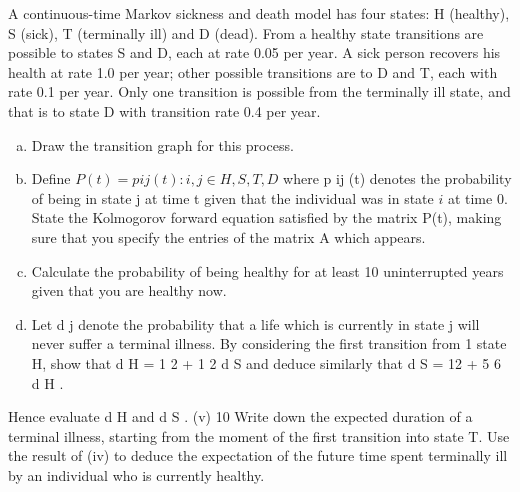 \documentclass[a4paper,12pt]{article}
\begin{document}
A continuous-time Markov sickness and death model has four states: H (healthy),
S (sick), T (terminally ill) and D (dead). From a healthy state transitions are possible to states S and D, each at rate 0.05 per year. A sick person recovers his health at rate 1.0 per year; other possible transitions are to D and T, each with
rate 0.1 per year. Only one transition is possible from the terminally ill state, and that is to state D with transition rate 0.4 per year.
\begin{enumerate}[(a)]
\item Draw the transition graph for this process.
\item Define $P(t) = {p ij (t) : i, j \in H, S, T, D}$ where p ij (t) denotes the probability of being in state j at time t given that the individual was in state $i$ at time 0.
State the Kolmogorov forward equation satisfied by the matrix P(t), making sure that you specify the entries of the matrix A which appears.

\item Calculate the probability of being healthy for at least 10 uninterrupted years given that you are healthy now.

\item Let d j denote the probability that a life which is currently in state j will never suffer a terminal illness. By considering the first transition from
1
state H, show that d H = 1 2 + 1 2 d S and deduce similarly that d S = 12
+ 5 6 d H .
\end{enumerate}

Hence evaluate d H and d S .
(v)
10
Write down the expected duration of a terminal illness, starting from the moment of the first transition into state T. Use the result of (iv) to deduce
the expectation of the future time spent terminally ill by an individual
who is currently healthy.
\end{document}
